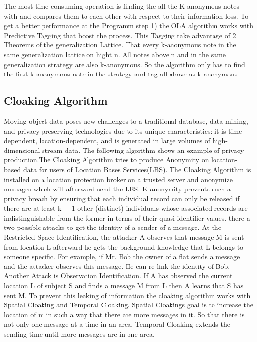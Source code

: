 \documentclass{llncs}
\begin{document}
The most time-consuming operation is finding the all the K-anonymous notes with and compares them to each other with respect to their information loss.  To get a better performance at the Programm step 1) the OLA algorithm works with Predictive Tagging that boost the process.  This Tagging take advantage of 2 Theorems of the generalization Lattice. That every k-anonymous note in the same generalization lattice on hight n. All notes above n and in the same generalization strategy are also k-anonymous. So the algorithm only has to find the first k-anonymous note in the strategy and tag all above as k-anonymous.   

\subsection{Cloaking Algorithm}
Moving object data poses new challenges to a traditional database, data mining, and privacy-preserving technologies due to its unique characteristics: it is time-dependent, location-dependent, and is generated in large volumes of high-dimensional stream data. The following algorithm shows an example of privacy production.The Cloaking Algorithm tries to produce Anonymity on location-based data for users of Location Bases Services(LBS). The Cloaking Algorithm is installed on a location protection broker on a trusted server and anonymize messages which will afterward send the LBS. K-anonymity prevents such a privacy breach by ensuring that each individual record can only be released if there are at least k − 1 other (distinct) individuals whose associated records are indistinguishable from the former in terms of their quasi-identifier values. there a two possible attacks to get the identity of a sender of a message. At the  Restricted Space Identification, the attacker A observes that message M is sent from location L afterward he gets the background knowledge that L belongs to someone specific. For example, if Mr. Bob the owner of a flat sends a message and the attacker observes this message. He can re-link the identity of Bob. Another Attack is  Observation Identiﬁcation. If A has observed the current location L of subject S and ﬁnds a message M from L then A learns that S has sent M.  To prevent this leaking of information the cloaking algorithm works with Spatial Cloaking and Temporal Cloaking. Spatial Cloakings goal is to increase the location of m in such a way that there are more messages in it. So that there is not only one message at a time in an area. Temporal Cloaking extends the sending time until more messages are in one area. 
\end{document}
